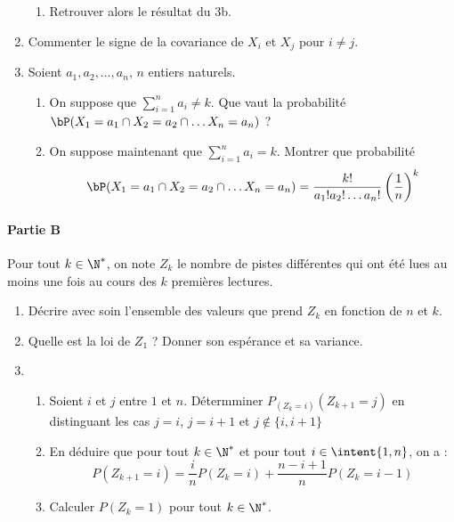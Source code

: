 \begin{probleme}
\begin{enumerate}
\begin{enumerate}
\item  Retrouver alors le résultat du 3b. 

\end{enumerate}
\item Commenter le signe de la covariance de $X_i$ et $X_j$ pour $i\neq j$. 



\item Soient $a_1, a_2, \dots, a_n$, $n$ entiers naturels. 
\begin{enumerate}
\item On suppose que $\sum_{i=1}^n a_i \neq k$. Que vaut la probabilité 
$\bP(X_1 =a_1 \cap X_2 =a_2 \cap \dots X_n =a_n)$ ? 

\item On suppose maintenant  que $\sum_{i=1}^n a_i = k$. Montrer que probabilité 
$$\bP(X_1 =a_1 \cap X_2 =a_2 \cap \dots X_n =a_n) = \frac{k!}{a_1! a_2! \dots a_n ! } \left( \frac{1}{n}\right)^k$$ 

\end{enumerate}
\end{enumerate}


\paragraph{Partie B}
\noindent 

Pour tout $k\in \N^*$, on note $Z_k$ le nombre de pistes différentes qui ont été lues au moins une fois au cours des $k$ premières lectures. 
\begin{enumerate}
\item Décrire avec soin l'ensemble des valeurs que prend $Z_k$ en fonction de $n$ et $k$. 


\item Quelle est la loi de $Z_1$ ? Donner son espérance et sa variance. 


\item \begin{enumerate}
\item Soient $i$  et $j$  entre $1$ et $n$. Détermminer $P_{(Z_k =i) } (Z_{k+1} =j)$ en distinguant les cas $j=i$, $j=i+1$ et $j\notin \{ i, i+1\}$


\item En déduire que pour tout $k\in \N^*$ et pour tout $i\in \intent{1, n}$, on a : 
$$P(Z_{k+1}  =i )= \frac{i}{n} P(Z_k =i ) + \frac{n-i+1}{n} P(Z_k =i-1)$$

\item Calculer $P(Z_k=1)$ pour tout $k\in \N^*$.


\end{enumerate}
\end{enumerate}
\end{probleme}
